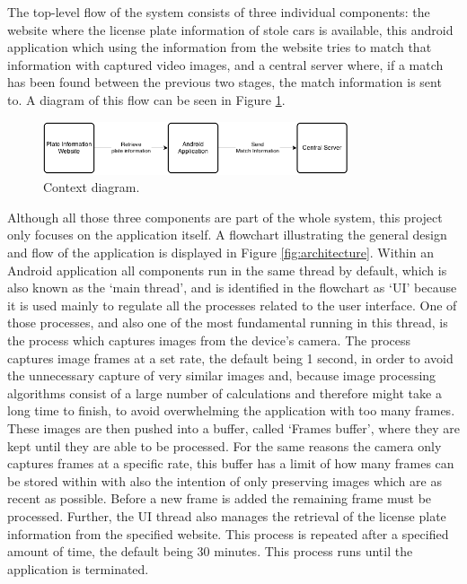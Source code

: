 The top-level flow of the system consists of three individual components: the website where the license plate information of stole cars is available, this android application which using the information from the website tries to match that information with captured video images, and a central server where, if a match has been found between the previous two stages, the match information is sent to. A diagram of this flow can be seen in Figure \ref{fig:top-level}.

\begin{figure}[ht]
    \centering
    \includegraphics[width=0.8\textwidth]{plaatjes/top-down}
    \caption{Context diagram.}
    \label{fig:top-level}
\end{figure}%

Although all those three components are part of the whole system, this project only focuses on the application itself. A flowchart illustrating the general design and flow of the application is displayed in Figure \ref{fig:architecture}. Within an Android application all components run in the same thread by default, which is also known as the `main thread', and is identified in the flowchart as `UI' because it is used mainly to regulate all the processes related to the user interface. One of those processes, and also one of the most fundamental running in this thread, is the process which captures images from the device's camera. The process captures image frames at a set rate, the default being 1 second, in order to avoid the unnecessary capture of very similar images and, because image processing algorithms consist of a large number of calculations and therefore might take a long time to finish, to avoid overwhelming the application with too many frames. These images are then pushed into a buffer, called `Frames buffer', where they are kept until they are able to be processed. For the same reasons the camera only captures frames at a specific rate, this buffer has a limit of how many frames can be stored within with also the intention of only preserving images which are as recent as possible. Before a new frame is added the remaining frame must be processed. Further, the UI thread also manages the retrieval of the license plate information from the specified website. This process is repeated after a specified amount of time, the default being 30 minutes. This process runs until the application is terminated.

